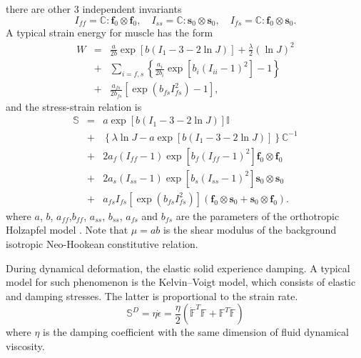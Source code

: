 \documentclass[12pt, a4paper,onecolumn]{article}
\begin{document}
%
there are other 3 independent invariants
%
\begin{equation}\label{extra-principle-invariants}
I_{ff}  =   \mathbb{C} : \mathbf{f}_0 \otimes\mathbf{f}_0,
\quad I_{ss}  =   \mathbb{C} : \mathbf{s}_0 \otimes\mathbf{s}_0,
\quad I_{fs}  =   \mathbb{C} : \mathbf{f}_0 \otimes\mathbf{s}_0.
\end{equation}
%
A typical strain energy for muscle has the form
%
\begin{eqnarray}\label{muscle-energy}
W  & = &  \frac{a}{2b}\exp\left[b (I_1 - 3 - 2\ln J)\right]  + \frac{\lambda}{2}(\ln J)^{2} \nonumber\\
&+& \sum_{i=f,s} \left\{\frac{a_i}{2b_i}\exp\left[b_i (I_{ii} - 1)^2\right] - 1 \right\} \\
&+ &\frac{a_{fs}}{2b_{fs}}\left[\exp(b_{fs} I^2_{fs}) - 1 \right], \nonumber
\end{eqnarray}
%
and the stress-strain relation is
%
\begin{eqnarray}\label{stress-strain-energy}
\mathbb{S} & = &  a\exp\left[b (I_1 - 3 - 2\ln J)\right] \mathbb{I} \nonumber \\
& + & \left\{ \lambda\ln J - a\exp\left[b (I_1 - 3 - 2\ln J)\right]\right\}\mathbb{C}^{-1}\nonumber\\
&+& 2 a_f(I_{ff} - 1)\exp\left[b_f (I_{ff} - 1)^2\right] \mathbf{f}_0 \otimes\mathbf{f}_0\\
&+& 2 a_s(I_{ss} - 1)\exp\left[b_s (I_{ss} - 1)^2\right] \mathbf{s}_0 \otimes\mathbf{s}_0\nonumber\\
&+ &a_{fs}I_{fs}\left[\exp(b_{fs} I^2_{fs})\right] 
(\mathbf{f}_0 \otimes\mathbf{s}_0 + \mathbf{s}_0 \otimes\mathbf{f}_0).\nonumber
\end{eqnarray}
% 
where $a$, $b$, $a_{ff}$,$b_{ff}$, $a_{ss}$, $b_{ss}$, $a_{fs}$ and $b_{fs}$ are 
the parameters of the orthotropic Holzapfel model \cite{holzapfel2009constitutive}.
Note that $\mu = ab$ is the shear modulus of 
the background isotropic Neo-Hookean constitutive relation.

During dynamical deformation, the elastic solid experience damping.
A typical model for such phenomenon is the Kelvin–Voigt model, 
which consists of elastic and damping stresses.
The latter is proportional to the strain rate.
%
\begin{equation}\label{solid-damping}
\mathbb{S}^{D} = \eta \dot{\epsilon} = \frac{\eta}{2} \left(\dot{\mathbb{F}}^{T}\mathbb{F} + \mathbb{F}^{T}\dot{\mathbb{F}} \right)
\end{equation}
%
where $\eta$ is the damping coefficient with the same dimension of fluid dynamical viscosity.
%
\end{document}
